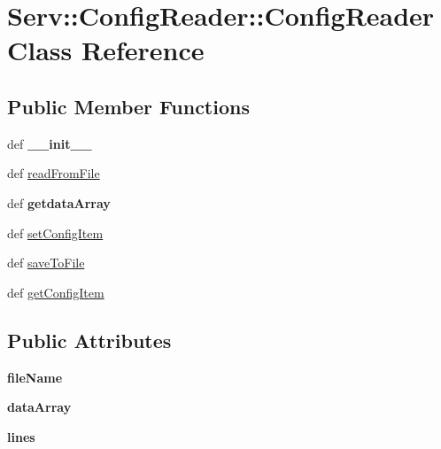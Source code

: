 \hypertarget{class_serv_1_1_config_reader_1_1_config_reader}{
\section{Serv::ConfigReader::ConfigReader Class Reference}
\label{class_serv_1_1_config_reader_1_1_config_reader}
}
\subsection*{Public Member Functions}
\begin{CompactItemize}
\item 
\hypertarget{class_serv_1_1_config_reader_1_1_config_reader_79fcc0800606aaab1c5b4b0f2910b821}{
def \textbf{\_\-\_\-init\_\-\_\-}}
\label{class_serv_1_1_config_reader_1_1_config_reader_79fcc0800606aaab1c5b4b0f2910b821}

\item 
def \hyperlink{class_serv_1_1_config_reader_1_1_config_reader_c8ff5305639fac5691feb7de4ae9ceea}{readFromFile}
\item 
\hypertarget{class_serv_1_1_config_reader_1_1_config_reader_6a032fedc46e0b5557d1124aeb5fc996}{
def \textbf{getdataArray}}
\label{class_serv_1_1_config_reader_1_1_config_reader_6a032fedc46e0b5557d1124aeb5fc996}

\item 
def \hyperlink{class_serv_1_1_config_reader_1_1_config_reader_44baeb28dc94ccbc797ab1164d98fa04}{setConfigItem}
\item 
def \hyperlink{class_serv_1_1_config_reader_1_1_config_reader_919cf4af7c9d0eb3a91ef578731edb0a}{saveToFile}
\item 
def \hyperlink{class_serv_1_1_config_reader_1_1_config_reader_9679117d87cde62fd4243670089a11cc}{getConfigItem}
\end{CompactItemize}
\subsection*{Public Attributes}
\begin{CompactItemize}
\item 
\hypertarget{class_serv_1_1_config_reader_1_1_config_reader_3d369f91bd609f90e8eead22a7c829e0}{
\textbf{fileName}}
\label{class_serv_1_1_config_reader_1_1_config_reader_3d369f91bd609f90e8eead22a7c829e0}

\item 
\hypertarget{class_serv_1_1_config_reader_1_1_config_reader_cf1f5f01f97b0d27a74c5466cf917a20}{
\textbf{dataArray}}
\label{class_serv_1_1_config_reader_1_1_config_reader_cf1f5f01f97b0d27a74c5466cf917a20}

\item 
\hypertarget{class_serv_1_1_config_reader_1_1_config_reader_2bc23c7436c3b44766cca7db8a1674a0}{
\textbf{lines}}
\label{class_serv_1_1_config_reader_1_1_config_reader_2bc23c7436c3b44766cca7db8a1674a0}

\end{CompactItemize}


